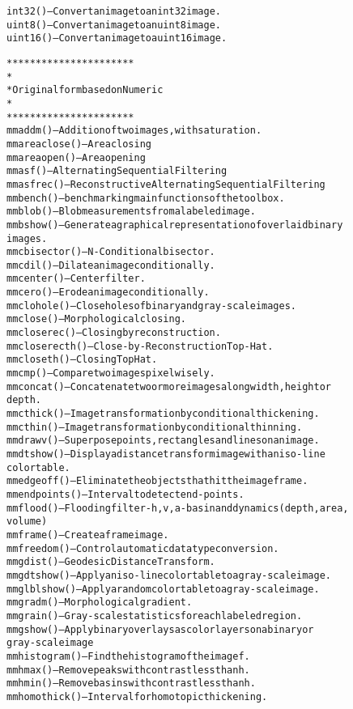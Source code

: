 \begin{alltt}
int32()          -- Convert an image to an int32 image.
uint8()          -- Convert an image to an uint8 image.
uint16()         -- Convert an image to a uint16 image.


**********************
*
* Original form based on Numeric
*
**********************
mmaddm()         -- Addition of two images, with saturation.
mmareaclose()    -- Area closing
mmareaopen()     -- Area opening
mmasf()          -- Alternating Sequential Filtering
mmasfrec()       -- Reconstructive Alternating Sequential Filtering
mmbench()        -- benchmarking main functions of the toolbox.
mmblob()         -- Blob measurements from a labeled image.
mmbshow()        -- Generate a graphical representation of overlaid binary
                    images.
mmcbisector()    -- N-Conditional bisector.
mmcdil()         -- Dilate an image conditionally.
mmcenter()       -- Center filter.
mmcero()         -- Erode an image conditionally.
mmclohole()      -- Close holes of binary and gray-scale images.
mmclose()        -- Morphological closing.
mmcloserec()     -- Closing by reconstruction.
mmcloserecth()   -- Close-by-Reconstruction Top-Hat.
mmcloseth()      -- Closing Top Hat.
mmcmp()          -- Compare two images pixelwisely.
mmconcat()       -- Concatenate two or more images along width, height or
                    depth.
mmcthick()       -- Image transformation by conditional thickening.
mmcthin()        -- Image transformation by conditional thinning.
mmdrawv()        -- Superpose points, rectangles and lines on an image.
mmdtshow()       -- Display a distance transform image with an iso-line
                    color table.
mmedgeoff()      -- Eliminate the objects that hit the image frame.
mmendpoints()    -- Interval to detect end-points.
mmflood()        -- Flooding filter- h,v,a-basin and dynamics (depth, area,
                    volume)
mmframe()        -- Create a frame image.
mmfreedom()      -- Control automatic data type conversion.
mmgdist()        -- Geodesic Distance Transform.
mmgdtshow()      -- Apply an iso-line color table to a gray-scale image.
mmglblshow()     -- Apply a random color table to a gray-scale image.
mmgradm()        -- Morphological gradient.
mmgrain()        -- Gray-scale statistics for each labeled region.
mmgshow()        -- Apply binary overlays as color layers on a binary or
                    gray-scale image
mmhistogram()    -- Find the histogram of the image f.
mmhmax()         -- Remove peaks with contrast less than h.
mmhmin()         -- Remove basins with contrast less than h.
mmhomothick()    -- Interval for homotopic thickening.

\end{alltt}
